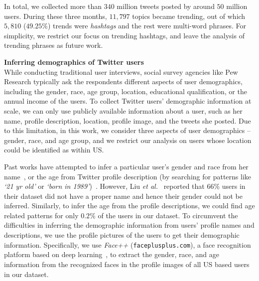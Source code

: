 \documentclass[letterpaper]{article}
\begin{document}
In total, we collected more than $340$ million tweets posted by around $50$ million users.
During these three months, $11,797$ topics became trending, out of which
$5,810$ ($49.25\%$) trends were {\it hashtags} and the rest were multi-word phrases.
For simplicity, we restrict our focus on trending hashtags, and leave the analysis of trending phrases as  future work.

\vspace{1mm}
\noindent \textbf{Inferring demographics of Twitter users} \\
\noindent While conducting traditional user interviews, 
social survey agencies like Pew Research 
typically ask the respondents different aspects of user
demographics, including the gender, race, age group, location,
educational qualification, or the annual income of the users.
To collect Twitter users' demographic information at scale,
we can only use publicly available information about a user,
such as her name, profile description, location, profile image,
and the tweets she posted. Due to this limitation, in this work, we consider three aspects of
user demographics -- gender, race, and age group, and we restrict our analysis on users
whose location could be identified as within US.

Past works have attempted to infer a particular user's gender and race
from her name~\cite{blevins2015jane,mislove2011understanding,liu2013s}, or
the age from Twitter profile description
(by searching for patterns like {\it `21 yr old'} or {\it `born in 1989'})~\cite{sloan2015tweets}.
However, Liu {\it et al.}~\cite{liu2013s} reported that $66\%$ users in their
dataset did not have a proper name and hence their gender could not be inferred.
Similarly, to infer the age from the profile descriptions,
we could find age related patterns for only $0.2\%$ of the users in our dataset.
To circumvent the difficulties in inferring the
demographic information from users' profile names and descriptions, we
use the profile pictures of the users to get their demographic information.
Specifically, we use {\it Face++} ({\tt faceplusplus.com}), 
a face recognition platform based on deep learning~\cite{yin2015learning},
to extract the gender, race, and age information from the recognized
faces in the profile images of all US based users in our dataset.
\end{document}
